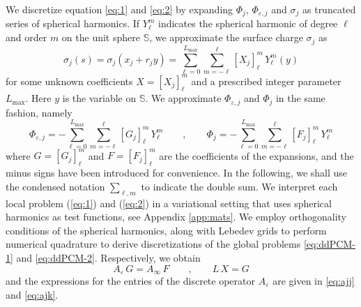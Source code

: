 We discretize equation \eqref{eq:1} and \eqref{eq:2} by expanding $\Phi_j$, $\Phi_{\varepsilon,j}$ and $\sigma_j$ as truncated series of spherical harmonics. If $Y_\ell^m$ indicates the spherical harmonic of degree $\ell$ and order $m$ on the unit sphere $\mathbb{S}$, we approximate the surface charge $\sigma_j$ as
\[
\sigma_j(s) = \sigma_j(x_j + r_j y) = \sum_{\ell=0}^{L_\text{max}} \sum_{m = -\ell}^\ell [X_j]_\ell^m \, Y_\ell^m(y)
\]
for some unknown coefficients $X = [X_j]_\ell^m$ and a prescribed integer parameter ${L_\text{max}}$. Here $y$ is the variable on $\mathbb{S}$. We approximate $\Phi_{\varepsilon,j}$ and $\Phi_j$ in the same fashion, namely
\[
\Phi_{\varepsilon,j} = - \sum_{\ell=0}^{L_\text{max}} \sum_{m = -\ell}^\ell [G_j]_\ell^m \, Y_\ell^m \qquad , \qquad \Phi_j = -\sum_{\ell=0}^{L_\text{max}} \sum_{m = -\ell}^\ell [F_j]_\ell^m \, Y_\ell^m
\]
where $G = [G_j]_\ell^m$ and $F = [F_j]_\ell^m$ are the coefficients of the expansions, and the minus signs have been introduced for convenience. In the following, we shall use the condensed notation $\sum_{\ell ,m}$ to indicate the double sum. We interpret each local problem (\ref{eq:1}) and (\ref{eq:2}) in a variational setting that uses spherical harmonics as test functions, see Appendix \ref{app:mats}. We employ orthogonality conditions of the spherical harmonics, along with Lebedev grids to perform numerical quadrature to derive discretizations of the global problems \eqref{eq:ddPCM-1} and \eqref{eq:ddPCM-2}. Respectively, we obtain
\begin{equation}\label{eq:6}
A_\varepsilon \, G = A_\infty \, F \qquad , \qquad  L \, X = G
\end{equation}
and the expressions for the entries of the discrete operator $A_\varepsilon$ are given in \eqref{eq:ajj} and \eqref{eq:ajk}.

